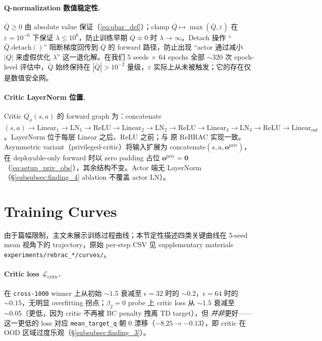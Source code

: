 \paragraph{Q-normalization 数值稳定性.}\quad
$\bar{Q} \ge 0$ 由 absolute value 保证（\eqref{eq:qbar_def}）；clamp $\bar{Q} \mapsto \max(\bar{Q}, \varepsilon)$ 在 $\varepsilon = 10^{-6}$ 下保证 $\lambda \le 10^6$，防止训练早期 $Q \approx 0$ 时 $\lambda \to \infty$。Detach 操作 ``$\bar{Q}.\mathrm{detach}()$'' 阻断梯度回传到 $\bar{Q}$ 的 forward 路径，防止出现 ``actor 通过减小 $|Q|$ 来虚假优化 $\lambda$'' 这一退化解。在我们 5 seeds $\times$ 64 epochs 全部 $\sim 320$ 次 epoch-level 评估中，$\bar{Q}$ 始终保持在 $|\bar{Q}| > 10^{-2}$ 量级，$\varepsilon$ 实际上从未被触发；它的存在仅是数值安全网。

\paragraph{Critic LayerNorm 位置.}\quad
Critic $Q_\phi(s, a)$ 的 forward graph 为：concatenate$(s, a) \to \mathrm{Linear}_1 \to \mathrm{LN}_1 \to \mathrm{ReLU} \to \mathrm{Linear}_2 \to \mathrm{LN}_2 \to \mathrm{ReLU} \to \mathrm{Linear}_3 \to \mathrm{LN}_3 \to \mathrm{ReLU} \to \mathrm{Linear}_{\text{out}}$。LayerNorm 位于每层 Linear 之后、ReLU 之前；与 \citet{tarasov2023rebrac} 原 ReBRAC 实现一致。Asymmetric variant（privileged-critic）将输入扩展为 concatenate$(s, a, \mathbf{o}^{\text{priv}})$，在 deployable-only forward 时以 zero padding 占位 $\mathbf{o}^{\text{priv}} = \mathbf{0}$（\eqref{eq:setup_priv_obs}），其余结构不变。Actor 端无 LayerNorm（\S\ref{subsubsec:finding_4} ablation 不覆盖 actor LN）。

\section{Training Curves}\label{app:curves}

由于篇幅限制，主文未展示训练过程曲线；本节定性描述四类关键曲线在 5-seed mean 视角下的 trajectory，原始 per-step CSV 见 supplementary materials \texttt{experiments/rebrac\_*/curves/}。

\paragraph{Critic loss $\mathcal{L}_{\text{critic}}$.}\quad
在 \texttt{cross-1000} winner 上从初始 $\sim 1.5$ 衰减至 $\epsilon = 32$ 时的 $\sim 0.2$，$\epsilon = 64$ 时的 $\sim 0.15$，无明显 overfitting 拐点；$\beta_2\!=\!0$ probe 上 critic loss 从 $\sim 1.5$ 衰减至 $\sim 0.05$（更低，因为 critic 不再被 BC penalty 拽离 TD target），但 \emph{并非}更好——这一更低的 loss 对应 \texttt{mean\_target\_q} 朝 $0$ 漂移（$-8.25 \to -0.13$），即 critic 在 OOD 区域过度乐观（\S\ref{subsubsec:finding_3}）。

